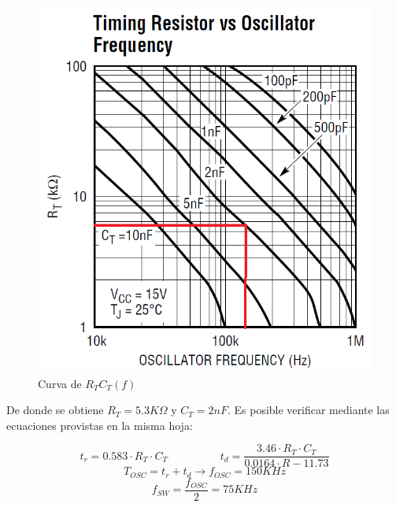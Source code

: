 \documentclass[e4_tp2_main.tex]{subfiles}
\begin{document}
\begin{figure}[H]
\centering
\includegraphics[width=0.3\linewidth]{Imagenes/Punto2/RT-OSC.png}
\caption{Curva de $R_TC_T(f)$}
\end{figure}

De donde se obtiene $R_T = 5.3K\Omega$ y $C_T = 2nF$. Es posible verificar mediante las ecuaciones provistas en la misma hoja:

\[
t_r = 0.583 \cdot R_T \cdot C_T \hspace{2cm} t_d = \frac{3.46 \cdot R_T \cdot C_T}{0.0164 \cdot R - 11.73}
\]
\[
T_{OSC} = t_r + t_d \longrightarrow f_{OSC} = 150KHz
\]
\[
f_{SW} = \frac{f_{OSC}}{2} = 75KHz
\]
\end{document}
